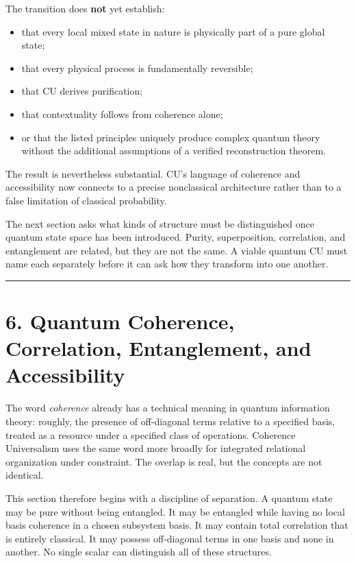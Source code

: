 \documentclass[
  11pt,
]{article}
\providecommand{\tightlist}{%
  \setlength{\itemsep}{0pt}\setlength{\parskip}{0pt}}
\begin{document}
The transition does \textbf{not} yet establish:

\begin{itemize}
\tightlist
\item
  that every local mixed state in nature is physically part of a pure
  global state;
\item
  that every physical process is fundamentally reversible;
\item
  that CU derives purification;
\item
  that contextuality follows from coherence alone;
\item
  or that the listed principles uniquely produce complex quantum theory
  without the additional assumptions of a verified reconstruction
  theorem.
\end{itemize}

The result is nevertheless substantial. CU's language of coherence and
accessibility now connects to a precise nonclassical architecture rather
than to a false limitation of classical probability.

The next section asks what kinds of structure must be distinguished once
quantum state space has been introduced. Purity, superposition,
correlation, and entanglement are related, but they are not the same. A
viable quantum CU must name each separately before it can ask how they
transform into one another.

\begin{center}\rule{0.5\linewidth}{0.5pt}\end{center}

\section{6. Quantum Coherence, Correlation, Entanglement, and
Accessibility}\label{quantum-coherence-correlation-entanglement-and-accessibility}

The word \emph{coherence} already has a technical meaning in quantum
information theory: roughly, the presence of off-diagonal terms relative
to a specified basis, treated as a resource under a specified class of
operations. Coherence Universalism uses the same word more broadly for
integrated relational organization under constraint. The overlap is
real, but the concepts are not identical.

This section therefore begins with a discipline of separation. A quantum
state may be pure without being entangled. It may be entangled while
having no local basis coherence in a chosen subsystem basis. It may
contain total correlation that is entirely classical. It may possess
off-diagonal terms in one basis and none in another. No single scalar
can distinguish all of these structures.
\end{document}
